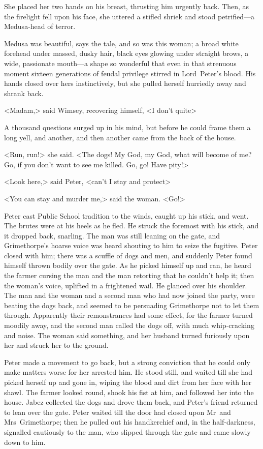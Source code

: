 She placed her two hands on his breast, thrusting him urgently back.  Then, as the firelight fell upon his face, she uttered a stifled shriek and stood petrified—a Medusa-head of terror.

Medusa was beautiful, says the tale, and so was this woman; a broad white forehead under massed, dusky hair, black eyes glowing under straight brows, a wide, passionate mouth—a shape so wonderful that even in that strenuous moment sixteen generations of feudal privilege stirred in Lord~Peter's blood. His hands closed over hers instinctively, but she pulled herself hurriedly away and shrank back.

<Madam,> said Wimsey, recovering himself, <I don't quite\longdash>

A thousand questions surged up in his mind, but before he could frame them a long yell, and another, and then another came from the back of the house.

<Run, run!> she said. <The dogs! My God, my God, what will become of me? Go, if you don't want to see me killed. Go, go! Have pity!>

<Look here,> said Peter, <can't I stay and protect\longdash>

<You can stay and murder me,> said the woman. <Go!>

Peter cast Public School tradition to the winds, caught up his stick, and went. The brutes were at his heels as he fled. He struck the foremost with his stick, and it dropped back, snarling. The man was still leaning on the gate, and Grimethorpe's hoarse voice was heard shouting to him to seize the fugitive. Peter closed with him; there was a scuffle of dogs and men, and suddenly Peter found himself thrown bodily over the gate. As he picked himself up and ran, he heard the farmer cursing the man and the man retorting that he couldn't help it; then the woman's voice, uplifted in a frightened wail. He glanced over his shoulder. The man and the woman and a second man who had now joined the party, were beating the dogs back, and seemed to be persuading Grimethorpe not to let them through. Apparently their remonstrances had some effect, for the farmer turned moodily away, and the second man called the dogs off, with much whip-cracking and noise. The woman said something, and her husband turned furiously upon her and struck her to the ground.

Peter made a movement to go back, but a strong conviction that he could only make matters worse for her arrested him. He stood still, and waited till she had picked herself up and gone in, wiping the blood and dirt from her face with her shawl. The farmer looked round, shook his fist at him, and followed her into the house. Jabez collected the dogs and drove them back, and Peter's friend returned to lean over the gate.
Peter waited till the door had closed upon Mr~and Mrs~Grimethorpe; then he pulled out his handkerchief and, in the half-darkness, signalled cautiously to the man, who slipped through the gate and came slowly down to him.

